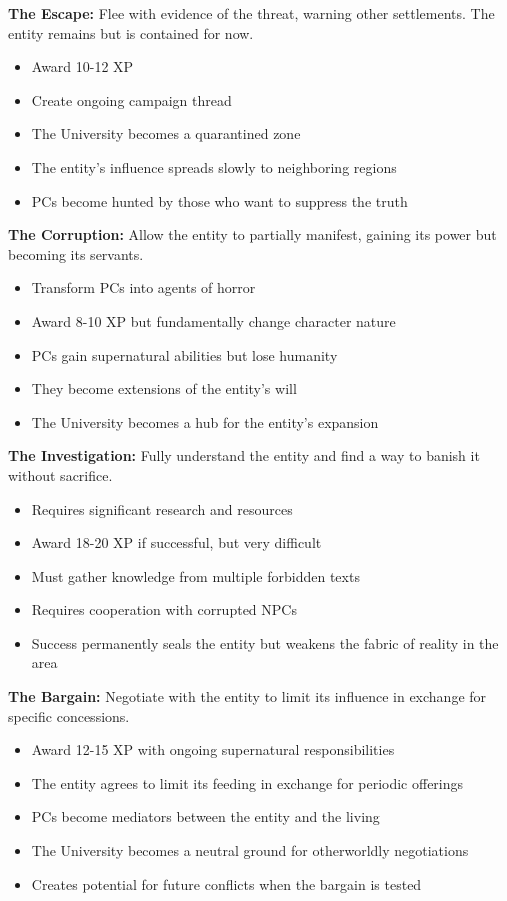 \documentclass[11pt]{article}
\begin{document}
\textbf{The Escape:}
Flee with evidence of the threat, warning other settlements. The entity remains but is contained for now.
\begin{itemize}
    \item Award 10-12 XP
    \item Create ongoing campaign thread
    \item The University becomes a quarantined zone
    \item The entity's influence spreads slowly to neighboring regions
    \item PCs become hunted by those who want to suppress the truth
\end{itemize}

\textbf{The Corruption:}
Allow the entity to partially manifest, gaining its power but becoming its servants.
\begin{itemize}
    \item Transform PCs into agents of horror
    \item Award 8-10 XP but fundamentally change character nature
    \item PCs gain supernatural abilities but lose humanity
    \item They become extensions of the entity's will
    \item The University becomes a hub for the entity's expansion
\end{itemize}

\textbf{The Investigation:}
Fully understand the entity and find a way to banish it without sacrifice.
\begin{itemize}
    \item Requires significant research and resources
    \item Award 18-20 XP if successful, but very difficult
    \item Must gather knowledge from multiple forbidden texts
    \item Requires cooperation with corrupted NPCs
    \item Success permanently seals the entity but weakens the fabric of reality in the area
\end{itemize}

\textbf{The Bargain:}
Negotiate with the entity to limit its influence in exchange for specific concessions.
\begin{itemize}
    \item Award 12-15 XP with ongoing supernatural responsibilities
    \item The entity agrees to limit its feeding in exchange for periodic offerings
    \item PCs become mediators between the entity and the living
    \item The University becomes a neutral ground for otherworldly negotiations
    \item Creates potential for future conflicts when the bargain is tested
\end{itemize}
\end{document}
